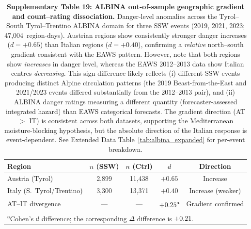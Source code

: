 \documentclass[11pt,letterpaper]{article}
\begin{document}
\begin{table}[!ht]
\centering
\caption{\textbf{Supplementary Table 19: ALBINA out-of-sample geographic gradient and count--rating dissociation.}
Danger-level anomalies across the Tyrol--South Tyrol--Trentino ALBINA domain for three SSW events (2019, 2021, 2023; 47,004~region-days). Austrian regions show consistently stronger danger increases ($d = +0.65$) than Italian regions ($d = +0.40$), confirming a \emph{relative} north--south gradient consistent with the EAWS pattern. However, note that both regions show \emph{increases} in danger level, whereas the EAWS 2012--2013 data show Italian centres \emph{decreasing}. This sign difference likely reflects (i) different SSW events producing distinct Alpine circulation patterns (the 2019 Beast-from-the-East and 2021/2023 events differed substantially from the 2012--2013 pair), and (ii) ALBINA danger ratings measuring a different quantity (forecaster-assessed integrated hazard) than EAWS categorical forecasts. The gradient direction (AT $>$ IT) is consistent across both datasets, supporting the Mediterranean moisture-blocking hypothesis, but the absolute direction of the Italian response is event-dependent. See Extended Data Table~\ref{tab:albina_expanded} for per-event breakdown.}
\label{tab:albina}
\small
\begin{tabular}{lcccc}
\toprule
Region & $n$ (SSW) & $n$ (Ctrl) & $d$ & Direction \\
\midrule
Austria (Tyrol) & 2,899 & 11,438 & $+0.65$ & Increase \\
Italy (S.\ Tyrol/Trentino) & 3,300 & 13,371 & $+0.40$ & Increase (weaker) \\
\midrule
AT--IT divergence & --- & --- & $+0.25$\textsuperscript{a} & Gradient confirmed \\
\bottomrule
\multicolumn{5}{l}{\footnotesize \textsuperscript{a}Cohen's $d$ difference; the corresponding $\Delta$ difference is $+0.21$.} \\
\end{tabular}
\end{table}
\end{document}
